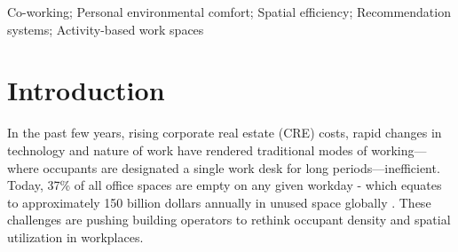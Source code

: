 \documentclass[]{interact}
\theoremstyle{plain}%
\theoremstyle{definition}
\theoremstyle{remark}
\begin{document}
\begin{abstract}

\end{abstract}

\begin{keywords}
Co-working; Personal environmental comfort; Spatial efficiency; Recommendation systems; Activity-based work spaces
\end{keywords}




\section{Introduction}

In the past few years, rising corporate real estate (CRE) costs, rapid changes in technology and nature of work have rendered traditional modes of working---where occupants are designated a single work desk for long periods---inefficient. Today, 37\% of all office spaces are empty on any given workday \citep{jll} - which equates to approximately 150 billion dollars annually in unused space globally \citep{cbre}. These challenges are pushing building operators to rethink occupant density and spatial utilization in workplaces.  
\end{document}

